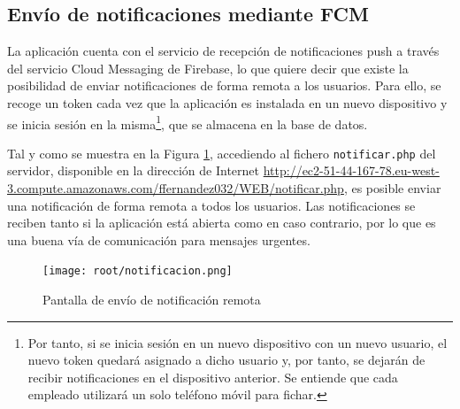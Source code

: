 \subsection{Envío de notificaciones mediante FCM}

La aplicación cuenta con el servicio de recepción de notificaciones push a través del servicio Cloud Messaging de Firebase, lo que quiere decir que existe la posibilidad de enviar notificaciones de forma remota a los usuarios. Para ello, se recoge un token cada vez que la aplicación es instalada en un nuevo dispositivo y se inicia sesión en la misma\footnote{Por tanto, si se inicia sesión en un nuevo dispositivo con un nuevo usuario, el nuevo token quedará asignado a dicho usuario y, por tanto, se dejarán de recibir notificaciones en el dispositivo anterior. Se entiende que cada empleado utilizará un solo teléfono móvil para fichar.}, que se almacena en la base de datos.

Tal y como se muestra en la Figura \ref{fig:notificacion}, accediendo al fichero \texttt{notificar.php} del servidor, disponible en la dirección de Internet \url{http://ec2-51-44-167-78.eu-west-3.compute.amazonaws.com/ffernandez032/WEB/notificar.php}, es posible enviar una notificación de forma remota a todos los usuarios. Las notificaciones se reciben tanto si la aplicación está abierta como en caso contrario, por lo que es una buena vía de comunicación para mensajes urgentes.

\begin{figure}
    \centering
    \texttt{[image: root/notificacion.png]}
    \caption{Pantalla de envío de notificación remota}
    \label{fig:notificacion}
\end{figure}